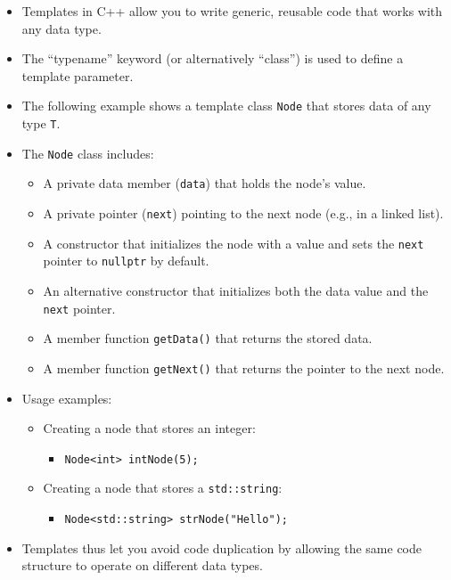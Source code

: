\documentclass{report}
\begin{document}
\begin{itemize}
	\item Templates in C++ allow you to write generic, reusable code that works with any data type.
	\item The “typename” keyword (or alternatively “class”) is used to define a template parameter.
	\item The following example shows a template class \texttt{Node} that stores data of any type \texttt{T}.
	\item The \texttt{Node} class includes:
	      \begin{itemize}
		      \item A private data member (\texttt{data}) that holds the node’s value.
		      \item A private pointer (\texttt{next}) pointing to the next node (e.g., in a linked list).
		      \item A constructor that initializes the node with a value and sets the \texttt{next} pointer to \texttt{nullptr} by default.
		      \item An alternative constructor that initializes both the data value and the \texttt{next} pointer.
		      \item A member function \texttt{getData()} that returns the stored data.
		      \item A member function \texttt{getNext()} that returns the pointer to the next node.
	      \end{itemize}
	\item Usage examples:
	      \begin{itemize}
		      \item Creating a node that stores an integer:
		            \begin{itemize}
			            \item \texttt{Node<int> intNode(5);}
		            \end{itemize}
		      \item Creating a node that stores a \texttt{std::string}:
		            \begin{itemize}
			            \item \texttt{Node<std::string> strNode("Hello");}
		            \end{itemize}
	      \end{itemize}
	\item Templates thus let you avoid code duplication by allowing the same code structure to operate on different data types.
\end{itemize}
\end{document}
